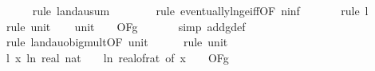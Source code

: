 \begin{isabellebody}
\ \ \ \ \isamarkupfalse%
\ {\isacharparenleft}{\kern0pt}rule\ landau{\isacharunderscore}{\kern0pt}sum{\isacharunderscore}{\kern0pt}{}{\isacharparenright}{\kern0pt}\isanewline
\ \ \ \ \ \ \isamarkupfalse%
\ {\isacharparenleft}{\kern0pt}rule\ eventually{\isacharunderscore}{\kern0pt}ln{\isacharunderscore}{\kern0pt}ge{\isacharunderscore}{\kern0pt}iff{\isacharbrackleft}{\kern0pt}OF\ n{\isacharunderscore}{\kern0pt}inf{\isacharbrackright}{\kern0pt}{\isacharparenright}{\kern0pt}\isanewline
\ \ \ \ \ \isamarkupfalse%
\ {\isacharparenleft}{\kern0pt}rule\ l{}{\isacharparenright}{\kern0pt}\isanewline
\ \ \ \ \isamarkupfalse%
\ {\isacharparenleft}{\kern0pt}rule\ unit{\isacharunderscore}{\kern0pt}{}{\isacharparenright}{\kern0pt}\isanewline
\isanewline
\ \ \isamarkupfalse%
\ unit{\isacharunderscore}{\kern0pt}{}{\isacharcolon}{\kern0pt}\ {\isachardoublequoteopen}{\isacharparenleft}{\kern0pt}{\isasymlambda}{\isacharunderscore}{\kern0pt}{\isachardot}{\kern0pt}\ {}{\isacharparenright}{\kern0pt}\ {\isasymin}\ O{\isacharbrackleft}{\kern0pt}{\isacharquery}{\kern0pt}F{\isacharbrackright}{\kern0pt}{\isacharparenleft}{\kern0pt}g{\isacharparenright}{\kern0pt}{\isachardoublequoteclose}\ \isanewline
\ \ \ \ \isamarkupfalse%
\ {\isacharparenleft}{\kern0pt}simp\ add{\isacharcolon}{\kern0pt}g{\isacharunderscore}{\kern0pt}def{\isacharparenright}{\kern0pt}\isanewline
\ \ \ \ \isamarkupfalse%
\ {\isacharparenleft}{\kern0pt}rule\ landau{\isacharunderscore}{\kern0pt}o{\isachardot}{\kern0pt}big{\isacharunderscore}{\kern0pt}mult{\isacharunderscore}{\kern0pt}{}{\isacharbrackleft}{\kern0pt}OF\ unit{\isacharunderscore}{\kern0pt}{}{\isacharbrackright}{\kern0pt}{\isacharparenright}{\kern0pt}\isanewline
\ \ \ \ \isamarkupfalse%
\ {\isacharparenleft}{\kern0pt}rule\ unit{\isacharunderscore}{\kern0pt}{}{\isacharparenright}{\kern0pt}\isanewline
\isanewline
\ \ \isamarkupfalse%
\ l{}{\isacharcolon}{\kern0pt}\ {\isachardoublequoteopen}{\isacharparenleft}{\kern0pt}{\isasymlambda}x{\isachardot}{\kern0pt}\ ln\ {\isacharparenleft}{\kern0pt}real\ {\isacharparenleft}{\kern0pt}nat\ {\isasymlceil}{\isacharminus}{\kern0pt}\ {\isacharparenleft}{\kern0pt}{}{}\ {\isacharasterisk}{\kern0pt}\ ln\ {\isacharparenleft}{\kern0pt}real{\isacharunderscore}{\kern0pt}of{\isacharunderscore}{\kern0pt}rat\ {\isacharparenleft}{\kern0pt}{\isasymepsilon}{\isacharunderscore}{\kern0pt}of\ x{\isacharparenright}{\kern0pt}{\isacharparenright}{\kern0pt}{\isacharparenright}{\kern0pt}{\isasymrceil}{\isacharparenright}{\kern0pt}\ {\isacharplus}{\kern0pt}\ {}{\isacharparenright}{\kern0pt}{\isacharparenright}{\kern0pt}\ {\isasymin}\ O{\isacharbrackleft}{\kern0pt}{\isacharquery}{\kern0pt}F{\isacharbrackright}{\kern0pt}{\isacharparenleft}{\kern0pt}g{\isacharparenright}{\kern0pt}{\isachardoublequoteclose}\ \isanewline

\end{isabellebody}
